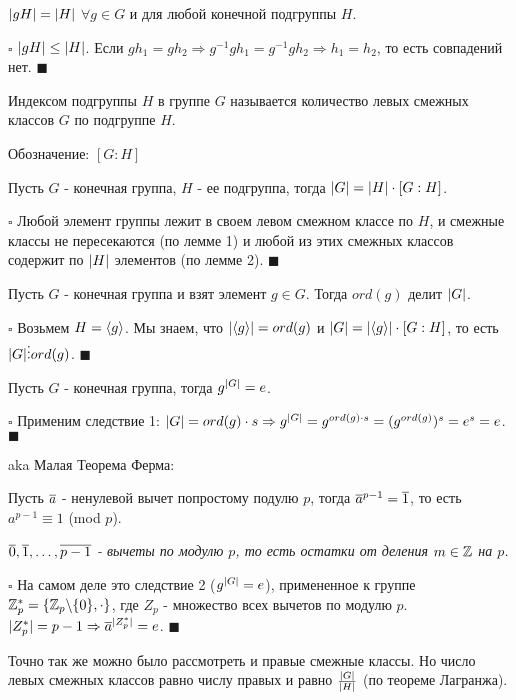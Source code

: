 \documentclass[../main.tex]{subfiles}
\begin{document}
\void
{} $\vert gH\vert = \vert H\vert$ $\forall g\in G$ и для любой конечной подгруппы $H$.

\void
$\square$ $\vert gH\vert\leq \vert H\vert$. Если $gh_1 = gh_2 \Rightarrow g^{-1}gh_1 = g^{-1}gh_2
\Rightarrow h_1 = h_2$, то есть совпадений нет. $\blacksquare$

\void
{} Индексом подгруппы $H$ в группе $G$ называется количество левых смежных классов $G$ по подгруппе $H$.

Обозначение: $[G:H]$

\void
{}

Пусть $G$ - конечная группа, $H$ - ее подгруппа, тогда $\vert G\vert = \vert H\vert\cdot [G:H]$.

\void
$\square$ Любой элемент группы лежит в своем левом смежном классе по $H$, и смежные классы не пересекаются
(по лемме 1) и любой из этих смежных классов содержит по $\vert H\vert$ элементов (по лемме 2).
$\blacksquare$

\void
{} Пусть $G$ - конечная группа и взят элемент $g\in G$. Тогда $ord(g)$ делит $\vert G\vert$.

\void
$\square$ Возьмем $H = \langle g\rangle$. Мы знаем, что $\vert \langle g\rangle\vert = ord(g)$ и
$\vert G\vert = \vert \langle g\rangle\vert\cdot [G:H]$, то есть $\vert G\vert\vdots ord(g)$.
$\blacksquare$

\void
{} Пусть $G$ - конечная группа, тогда $g^{\vert G\vert} = e$.

\void
$\square$ Применим следствие 1: $\vert G\vert = ord(g)\cdot s \Rightarrow g^{\vert G\vert} = g^{ord(g)\cdot s} =
(g^{ord(g)})^s = e^s = e$.
$\blacksquare$

\void
{} aka Малая Теорема Ферма:

Пусть $\overline{a}$ - ненулевой вычет попростому подулю $p$, тогда $\overline{a}^{p-1} = \overline{1}$,
то есть $a^{p-1}\equiv 1$ (mod $p$).

\void
\textit{$\overline{0}, \overline{1},\dots,\overline{p-1}$ - вычеты по модулю $p$, то есть остатки от деления
$m\in\mathbb{Z}$ на $p$.}

\void
$\square$ На самом деле это следствие 2 ($g^{\vert G\vert} = e$), примененное к группе 
$\mathbb{Z}_p^* = \{ \mathbb{Z}_p\backslash \{0\}, \cdot \}$, где $Z_p$ - множество всех вычетов по модулю $p$.
$\vert Z_p^*\vert = p - 1 \Rightarrow \overline{a}^{\vert Z_p^*\vert} = e$.
$\blacksquare$

\void
{} Точно так же можно было рассмотреть и правые смежные классы. Но число левых смежных классов
равно числу правых и равно $\frac{\vert G\vert}{\vert H\vert}$ (по теореме Лагранжа).
\end{document}
